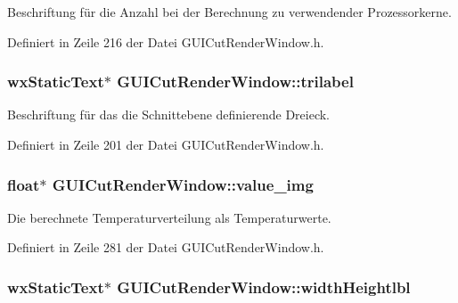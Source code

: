 Beschriftung für die Anzahl bei der Berechnung zu verwendender Prozessorkerne. 



Definiert in Zeile 216 der Datei G\-U\-I\-Cut\-Render\-Window.\-h.

\hypertarget{classGUICutRenderWindow_a1d6dae72dbc65725dee34799e7fb7af1}{
\subsubsection[{trilabel}]{\setlength{\rightskip}{0pt plus 5cm}wx\-Static\-Text$\ast$ G\-U\-I\-Cut\-Render\-Window\-::trilabel\hspace{0.3cm}{\ttfamily [private]}}}\label{classGUICutRenderWindow_a1d6dae72dbc65725dee34799e7fb7af1}


Beschriftung für das die Schnittebene definierende Dreieck. 



Definiert in Zeile 201 der Datei G\-U\-I\-Cut\-Render\-Window.\-h.

\hypertarget{classGUICutRenderWindow_a9c8338a733363aea25a8735d6873a414}{
\subsubsection[{value\-\_\-img}]{\setlength{\rightskip}{0pt plus 5cm}float$\ast$ G\-U\-I\-Cut\-Render\-Window\-::value\-\_\-img\hspace{0.3cm}{\ttfamily [private]}}}\label{classGUICutRenderWindow_a9c8338a733363aea25a8735d6873a414}


Die berechnete Temperaturverteilung als Temperaturwerte. 



Definiert in Zeile 281 der Datei G\-U\-I\-Cut\-Render\-Window.\-h.

\hypertarget{classGUICutRenderWindow_a26632978654028e6fbfaa6eef704ff06}{
\subsubsection[{width\-Heightlbl}]{\setlength{\rightskip}{0pt plus 5cm}wx\-Static\-Text$\ast$ G\-U\-I\-Cut\-Render\-Window\-::width\-Heightlbl\hspace{0.3cm}{\ttfamily [private]}}}\label{classGUICutRenderWindow_a26632978654028e6fbfaa6eef704ff06}



